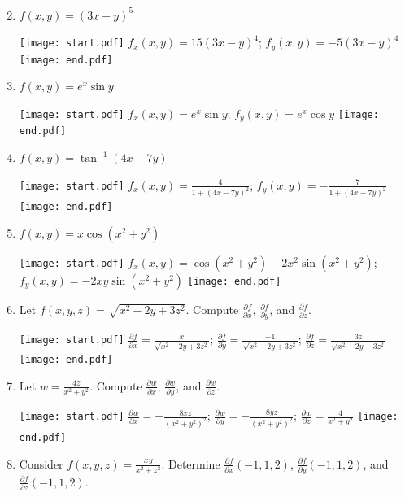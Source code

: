 \documentclass[12pt]{article}
\begin{document}
\newpage


\begin{enumerate}
\setcounter{enumi}{1}

\item $f(x,y)=(3x-y)^5$

\texttt{[image: start.pdf]}
{{$f_x(x,y)=15(3x-y)^4$; $f_y(x,y)=-5(3x-y)^4$}}
\texttt{[image: end.pdf]}


\item $f(x,y)=e^x\sin{y}$

\texttt{[image: start.pdf]}
{{$f_x(x,y)=e^x\sin{y}$; $f_y(x,y)=e^x\cos{y}$}}
\texttt{[image: end.pdf]}


\item $f(x,y)=\tan^{-1}{(4x-7y)}$

\texttt{[image: start.pdf]}
{{$f_x(x,y)=\frac{4}{1+(4x-7y)^2}$; $f_y(x,y)=-\frac{7}{1+(4x-7y)^2}$}}
\texttt{[image: end.pdf]}


\item $f(x,y)=x\cos{(x^2+y^2)}$

\texttt{[image: start.pdf]}
{{$f_x(x,y)=\cos{(x^2+y^2)}-2x^2\sin{(x^2+y^2)}$; $f_y(x,y)=-2xy\sin{(x^2+y^2)}$}}
\texttt{[image: end.pdf]}


\item Let $f(x,y,z)=\sqrt{x^2-2y+3z^2}$.  Compute $\frac{\partial f}{\partial x}$,  $\frac{\partial f}{\partial y}$, and $\frac{\partial f}{\partial z}$.

\texttt{[image: start.pdf]}
{{$\frac{\partial f}{\partial x}=\frac{x}{\sqrt{x^2-2y+3z^2}}$; $\frac{\partial f}{\partial y}=\frac{-1}{\sqrt{x^2-2y+3z^2}}$; $\frac{\partial f}{\partial z}=\frac{3z}{\sqrt{x^2-2y+3z^2}}$}}
\texttt{[image: end.pdf]}


\item Let $w=\frac{4z}{x^2+y^2}$.  Compute $\frac{\partial w}{\partial x}$, $\frac{\partial w}{\partial y}$, and $\frac{\partial w}{\partial z}$.

\texttt{[image: start.pdf]}
{{$\frac{\partial w}{\partial x}=-\frac{8xz}{(x^2+y^2)^2}$; $\frac{\partial w}{\partial y}=-\frac{8yz}{(x^2+y^2)^2}$; $\frac{\partial w}{\partial z}=\frac{4}{x^2+y^2}$}}
\texttt{[image: end.pdf]}


\item Consider $f(x,y,z)=\frac{xy}{x^2+z^2}$.  Determine $\frac{\partial f}{\partial x}(-1, 1, 2)$, $\frac{\partial f}{\partial y}(-1, 1, 2)$, and $\frac{\partial f}{\partial z}(-1, 1, 2)$.


\end{enumerate}
\end{document}

